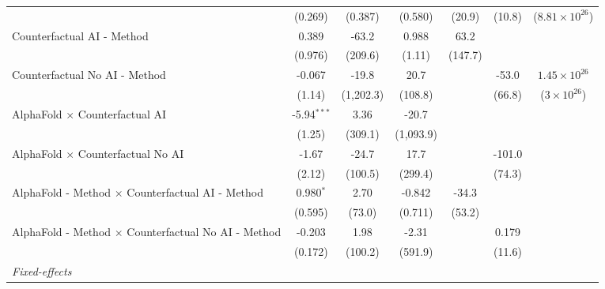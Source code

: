 \begin{tabular}{lcccccc}
                                                              & (0.269)       & (0.387)       & (0.580)    & (20.9)         & (10.8)        & ($8.81\times 10^{26}$)\\    
   Counterfactual AI - Method                                 & 0.389         & -63.2         & 0.988      & 63.2           &               &   \\   
                                                              & (0.976)       & (209.6)       & (1.11)     & (147.7)        &               &   \\   
   Counterfactual No AI - Method                              & -0.067        & -19.8         & 20.7       &                & -53.0         & $1.45\times 10^{26}$\\    
                                                              & (1.14)        & (1,202.3)     & (108.8)    &                & (66.8)        & ($3\times 10^{26}$)\\    
   AlphaFold $\times$ Counterfactual AI                       & -5.94$^{***}$ & 3.36          & -20.7      &                &               &   \\   
                                                              & (1.25)        & (309.1)       & (1,093.9)  &                &               &   \\   
   AlphaFold $\times$ Counterfactual No AI                    & -1.67         & -24.7         & 17.7       &                & -101.0        &   \\   
                                                              & (2.12)        & (100.5)       & (299.4)    &                & (74.3)        &   \\   
   AlphaFold - Method $\times$ Counterfactual AI - Method     & 0.980$^{*}$   & 2.70          & -0.842     & -34.3          &               &   \\   
                                                              & (0.595)       & (73.0)        & (0.711)    & (53.2)         &               &   \\   
   AlphaFold - Method $\times$ Counterfactual No AI - Method  & -0.203        & 1.98          & -2.31      &                & 0.179         &   \\   
                                                              & (0.172)       & (100.2)       & (591.9)    &                & (11.6)        &   \\   
   \midrule
   \emph{Fixed-effects}\\

\end{tabular}

